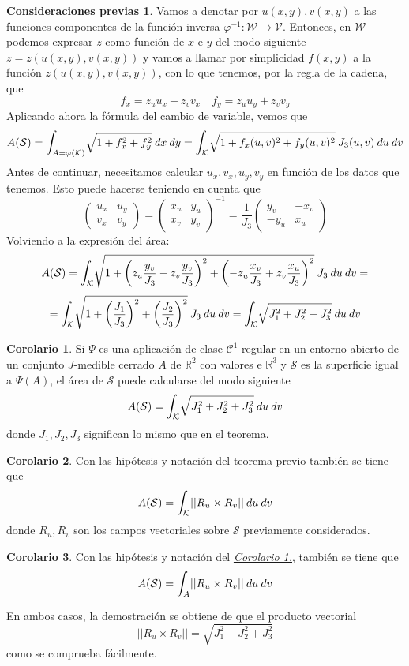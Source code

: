 \documentclass[12pt,twoside]{report}
\newcommand\mc[1]{\mathcal{#1}}
\theoremstyle{azul}
\theoremstyle{azul2}
\theoremstyle{plain}
\theoremstyle{definition}
\newtheorem*{consprev}{Consideraciones previas}
\newtheorem{coro}{Corolario}
\theoremstyle{remark}
\begin{document}
\begin{consprev}
 Vamos a denotar por $u(x,y), v(x,y)$ a las funciones componentes de la función inversa $\varphi^{-1}: \mc{W} \longrightarrow \mc{V}$. Entonces, en $\mc{W}$ podemos expresar $z$ como función de $x$ e $y$ del modo siguiente
 $z=z(u(x,y), v(x,y))$ y vamos a llamar por simplicidad $f(x,y)$ a la función $z(u(x,y), v(x,y))$, con lo que tenemos, por la regla de la cadena, que $$f_x=z_u u_x + z_v v_x \quad  f_y=z_u u_y + z_v v_y$$
 Aplicando ahora la fórmula del cambio de variable, vemos que $$A(\mc{S})=\mathlarger{\int}_{A=\varphi(\mc{K})} \sqrt{1+f_x^2+f_y^2} \: dx \: dy = \mathlarger{\int}_{\mc{K}} \sqrt{1+f_x(u,v)^2+f_y(u,v)^2} \: J_3(u,v) \: du \: dv$$
 Antes de continuar, necesitamos calcular $u_x, v_x, u_y, v_y$ en función de los datos que tenemos. Esto puede hacerse teniendo en cuenta que 
 $$\left(\begin{array}{cc}
      u_x & u_y  \\
      v_x & v_y
 \end{array}\right) = \left(\begin{array}{cc}
      x_u & y_u  \\
      x_v & y_v
 \end{array}\right)^{-1}=\dfrac{1}{J_3}\left(\begin{array}{cc}
      y_v & -x_v  \\
      -y_u & x_u
 \end{array}\right)$$
 Volviendo a la expresión del área:
 $$A(\mc{S})=\mathlarger{\int}_{\mc{K}} \sqrt{1+\left( z_u \dfrac{y_v}{J_3} - z_v \dfrac{y_v}{J_3}\right)^2 +\left( - z_u \dfrac{x_v}{J_3} + z_v \dfrac{x_u}{J_3}\right)^2 } \: J_3 \: du \: dv = $$
 $$= \mathlarger{\int}_{\mc{K}} \sqrt{1+\left( \dfrac{J_1}{J_3} \right)^2 +\left( \dfrac{J_2}{J_3}\right )^2 } \: J_3 \: du \: dv = \mathlarger{\int}_{\mc{K}} \sqrt{J_1^2 + J_2^2 + J_3^2} \: du \: dv$$
 \end{consprev}
 \begin{coro} \label{cor1}
 Si $\Psi$ es una aplicación de clase $\mc{C}^1$ regular en un entorno abierto de un conjunto $J$-medible cerrado $A$ de $\mathbb{R}^2$ con valores e $\mathbb{R}^3$ y $\mc{S}$ es la superficie igual a $\Psi(A)$, el área de $\mc{S}$ puede calcularse del modo siguiente
 $$A(\mc{S})=\mathlarger{\int}_{\mc{K}} \sqrt{J_1^2 + J_2^2 + J_3^2} \: du \: dv$$
 donde $J_1, J_2, J_3$ significan lo mismo que en el teorema. 
 \end{coro}
 \begin{coro} 
 Con las hipótesis y notación del teorema previo también se tiene que $$A(\mc{S}) = \mathlarger{\int}_{\mc{K}} ||R_u \times R_v|| \: du \: dv$$ donde $R_u, R_v$ son los campos vectoriales sobre $\mc{S}$ previamente considerados.  
 \end{coro}
 \begin{coro}
 Con las hipótesis y notación del \hyperref[cor1]{\textit{Corolario 1.}}, también se tiene que $$A(\mc{S}) = \mathlarger{\int}_{A} ||R_u \times R_v|| \: du \: dv$$
 \end{coro}
 En ambos casos, la demostración se obtiene de que el producto vectorial $$||R_u \times R_v|| =  \sqrt{J_1^2 + J_2^2 + J_3^2} $$ como se comprueba fácilmente. 
\end{document}
